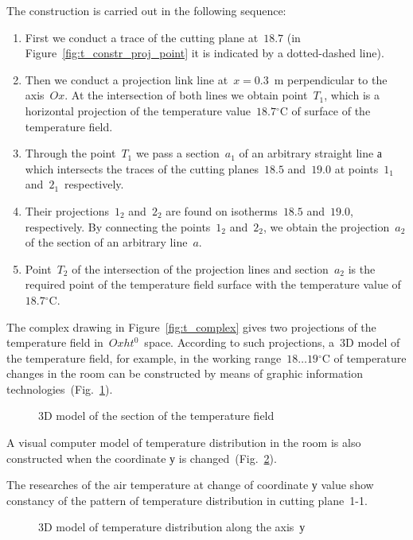 \documentclass[12pt,twoside]{article}
\newcommand{\FigRef}[2][]{(Fig.~\ref{#2}\textit{#1})}
\newcommand{\degC}{{}^{\circ}\text{C}} %
\begin{document}
\begin{JGGarticle}
			The construction is carried out in the following sequence:
			\begin{enumerate}
				\item First we conduct a trace of the cutting plane at~$18.7$ (in Figure~\ref{fig:t_constr_proj_point} it is indicated by a dotted-dashed line).
				\item Then we conduct a projection link line at~$x = 0.3$~m perpendicular to the axis~$Ox$. At the intersection of both lines we obtain point~$T_1$, which is a horizontal projection of the temperature value~$18.7\degC$ of surface of the temperature field.
				\item Through the point~$T_1$ we pass a section~$a_1$ of an arbitrary straight line а which intersects the traces of the cutting planes~$18.5$ and~$19.0$ at points~$1_1$ and~$2_1$~respectively.
				\item Their projections~$1_2$ and~$2_2$ are found on isotherms~$18.5$ and~$19.0$, respectively. By connecting the points~$1_2$ and~$2_2$, we obtain the projection~$a_2$ of the section of an arbitrary line~$a$.
				\item Point~$T_2$ of the intersection of the projection lines and section~$a_2$ is the required point of the temperature field surface with the temperature value of~$18.7\degC$.
			\end{enumerate}
			The complex drawing in Figure~\ref{fig:t_complex} gives two projections of the temperature field in~$Oxht^0$~space. According to such projections, a~$3$D model of the temperature field, for example, in the working range~$18 \dotso 19\degC$ of temperature changes in the room can be constructed by means of graphic information technologies~\FigRef{fig:t_3D}.
			\begin{figure}[!hbt]
				\caption{3D model of the section of the temperature field}
				\label{fig:t_3D}
			\end{figure}
		
			A visual computer model of temperature distribution in the room is also constructed when the coordinate у is changed~\FigRef{fig:t_along_3D}.
			
			The researches of the air temperature at change of coordinate у value show constancy of the pattern of temperature distribution in cutting plane~1-1.
			\begin{figure}[!hbt]
				\caption{3D model of temperature distribution along the axis~$у$}
				\label{fig:t_along_3D}
			\end{figure}
		

\end{JGGarticle}
\end{document}
